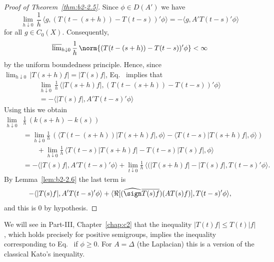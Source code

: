 \begin{proof}[Proof of Theorem~\ref{thm:b2-2.5}]
Since $\phi \in D(A')$ we have
\begin{equation}\label{eq:b2-2.14}
\lim_{h \downarrow 0}\, \frac{1}{h}\, \langle g,(T(t-(s+h)) - T(t-s))'\phi \rangle = - \langle g,A'T(t-s)'\phi \rangle
\end{equation}
for all $g \in C_{0}(X)$.
Consequently,
\begin{equation*}
\overline{\lim}_{h \downarrow 0}\, \frac{1}{h}\, \norm{(T(t-(s+h)) - T(t-s))'\phi} < \infty
\end{equation*}
by the uniform boundedness principle.
Hence, since $\lim_{h \downarrow 0}\, |T(s+h)f| = |T(s)f|$, Eq.~ implies that
\begin{equation}\label{eq:b2-2.15}
\begin{split}
\lim_{h \downarrow 0}\, \frac{1}{h}\, \langle |T(s+h)f|,(T(t-(s+h)) - T(t-s))'\phi \rangle \\
= - \langle |T(s)f|,A'T(t-s)'\phi \rangle
\end{split}
\end{equation}
Using this we obtain
\begin{align*}
\lim_{h \downarrow 0} & \frac{1}{h}\, (k(s+h) - k(s)) \\
&= \lim_{h \downarrow 0}  \frac{1}{h}\, (\langle T(t-(s+h))|T(s+h)f|,\phi \rangle - \langle T(t-s)|T(s+h)f|,\phi \rangle) \\
&\qquad + \lim_{h \downarrow 0}  \frac{1}{h}\, \langle T(t-s)|T(s+h)f| - T(t-s)|T(s)f|,\phi \rangle \\
&= -\langle |T(s)f|,A'T(t-s)'\phi \rangle + \lim_{t \downarrow 0}  \frac{1}{h} \, \langle (|T(s+h)f| -  |T(s)f| , T(t-s)'\phi \rangle .
\end{align*}
By Lemma~\ref{lem:b2-2.6} the last term is
\begin{align*}
- \langle |T(s)f|,A'T(t-s)'\phi \rangle + \langle \Re[(\widehat{\sign} \overline{T(s)f})(AT(s)f)],T(t-s)'\phi \rangle,
\end{align*}
and this is $0$ by hypothesis.
\end{proof}
\begin{remark}\label{rem:b2-2.7}
We will see in Part-III, Chapter~\ref{chap:c2} that the inequality $|T(t)f| \leq T(t)|f|$, which holds precisely for positive semigroups, implies the inequality corresponding to Eq.~
if\/ $\phi \geq 0$.
For $A = \Delta$ (the Laplacian) this is a version of the classical Kato's inequality.
\end{remark}
